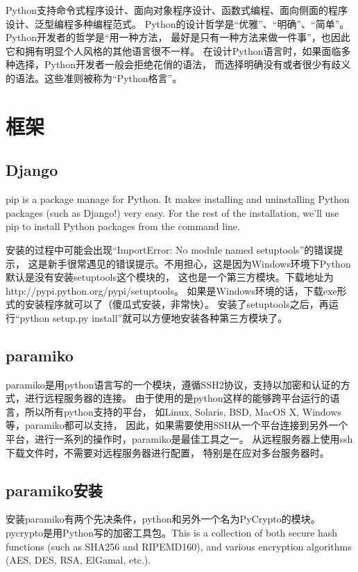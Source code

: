 \documentclass{book}
\begin{document}
Python支持命令式程序设计、面向对象程序设计、函数式编程、面向侧面的程序设计、泛型编程多种编程范式。
Python的设计哲学是“优雅”、“明确”、“简单”。Python开发者的哲学是“用一种方法，
最好是只有一种方法来做一件事”，也因此它和拥有明显个人风格的其他语言很不一样。
在设计Python语言时，如果面临多种选择，Python开发者一般会拒绝花俏的语法，
而选择明确没有或者很少有歧义的语法。这些准则被称为“Python格言”。

\section{框架}

\subsection{Django}

pip is a package manage for Python. 
It makes installing and uninstalling Python packages (such as Django!) very easy. 
For the rest of the installation, we’ll use pip to install Python packages from the command line.

安装的过程中可能会出现“ImportError: No module named setuptools”的错误提示，
这是新手很常遇见的错误提示。不用担心，这是因为Windows环境下Python默认是没有安装setuptools这个模块的，
这也是一个第三方模块。下载地址为http://pypi.python.org/pypi/setuptools。
如果是Windows环境的话，下载exe形式的安装程序就可以了（傻瓜式安装，非常快）。
安装了setuptools之后，再运行“python setup.py install”就可以方便地安装各种第三方模块了。

\subsection{paramiko}

paramiko是用python语言写的一个模块，遵循SSH2协议，支持以加密和认证的方式，进行远程服务器的连接。
由于使用的是python这样的能够跨平台运行的语言，所以所有python支持的平台，
如Linux, Solaris, BSD, MacOS X, Windows等，paramiko都可以支持，
因此，如果需要使用SSH从一个平台连接到另外一个平台，进行一系列的操作时，paramiko是最佳工具之一。
从远程服务器上使用ssh下载文件时，不需要对远程服务器进行配置，
特别是在应对多台服务器时。

\subsection{paramiko安装}

安装paramiko有两个先决条件，python和另外一个名为PyCrypto的模块。
pycrypto是用Python写的加密工具包。This is a collection of both secure hash functions (such as SHA256 and RIPEMD160), 
and various encryption algorithms (AES, DES, RSA, ElGamal, etc.).
\end{document}
